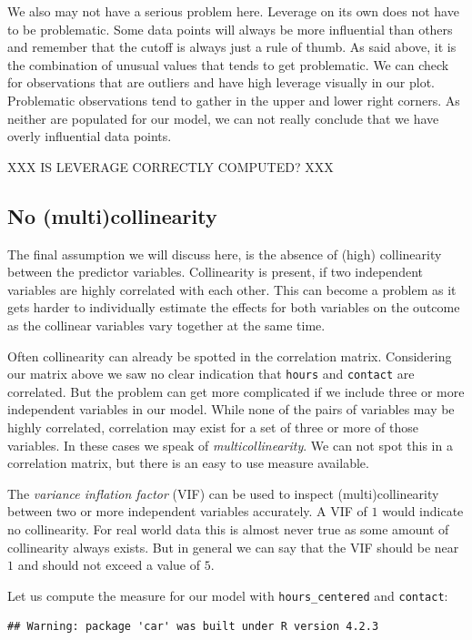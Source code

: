 \documentclass[
]{book}
\begin{document}
We also may not have a serious problem here. Leverage on its own does not have
to be problematic. Some data points will always be more influential than others
and remember that the cutoff is always just a rule of thumb. As said above, it
is the combination of unusual values that tends to get problematic. We can check
for observations that are outliers and have high leverage visually in our plot.
Problematic observations tend to gather in the upper and lower right corners.
As neither are populated for our model, we can not really conclude that we have
overly influential data points.

XXX IS LEVERAGE CORRECTLY COMPUTED? XXX

\hypertarget{no-multicollinearity}{%
\subsection{No (multi)collinearity}\label{no-multicollinearity}}

The final assumption we will discuss here, is the absence of (high) collinearity
between the predictor variables. Collinearity is present, if two independent
variables are highly correlated with each other. This can become a problem as it
gets harder to individually estimate the effects for both variables on the
outcome as the collinear variables vary together at the same time.

Often collinearity can already be spotted in the correlation matrix. Considering
our matrix above we saw no clear indication that \texttt{hours} and \texttt{contact} are
correlated. But the problem can get more complicated if we include three or more
independent variables in our model. While none of the pairs of variables may be
highly correlated, correlation may exist for a set of three or more of those
variables. In these cases we speak of \emph{multicollinearity}. We can not spot this
in a correlation matrix, but there is an easy to use measure available.

The \emph{variance inflation factor} (VIF) can be used to inspect (multi)collinearity
between two or more independent variables accurately. A VIF of \(1\) would
indicate no collinearity. For real world data this is almost never true as some
amount of collinearity always exists. But in general we can say that the VIF
should be near \(1\) and should not exceed a value of \(5\).

Let us compute the measure for our model with \texttt{hours\_centered} and \texttt{contact}:

\begin{verbatim}
## Warning: package 'car' was built under R version 4.2.3
\end{verbatim}
\end{document}
